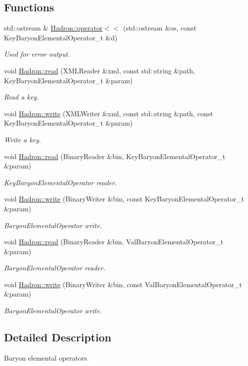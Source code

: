 \subsection*{Functions}
\begin{DoxyCompactItemize}
\item 
std\+::ostream \& \mbox{\hyperlink{namespaceHadron_aa9e7054b51bfae4b2afe5aeb8f904b2b}{Hadron\+::operator$<$$<$}} (std\+::ostream \&os, const Key\+Baryon\+Elemental\+Operator\+\_\+t \&d)
\begin{DoxyCompactList}\small\item\em Used for error output. \end{DoxyCompactList}\item 
void \mbox{\hyperlink{namespaceHadron_a61520b9a5ce2b207d1c01e1508a5c470}{Hadron\+::read}} (X\+M\+L\+Reader \&xml, const std\+::string \&path, Key\+Baryon\+Elemental\+Operator\+\_\+t \&param)
\begin{DoxyCompactList}\small\item\em Read a key. \end{DoxyCompactList}\item 
void \mbox{\hyperlink{namespaceHadron_ac358b1203bd94f6b26452402911ce174}{Hadron\+::write}} (X\+M\+L\+Writer \&xml, const std\+::string \&path, const Key\+Baryon\+Elemental\+Operator\+\_\+t \&param)
\begin{DoxyCompactList}\small\item\em Write a key. \end{DoxyCompactList}\item 
void \mbox{\hyperlink{namespaceHadron_afb941d679afa3b1d65ca3048b28bc78c}{Hadron\+::read}} (Binary\+Reader \&bin, Key\+Baryon\+Elemental\+Operator\+\_\+t \&param)
\begin{DoxyCompactList}\small\item\em Key\+Baryon\+Elemental\+Operator reader. \end{DoxyCompactList}\item 
void \mbox{\hyperlink{namespaceHadron_a4c0a824fa457c4fbaac034c83f5554c5}{Hadron\+::write}} (Binary\+Writer \&bin, const Key\+Baryon\+Elemental\+Operator\+\_\+t \&param)
\begin{DoxyCompactList}\small\item\em Baryon\+Elemental\+Operator write. \end{DoxyCompactList}\item 
void \mbox{\hyperlink{namespaceHadron_ae87d364dcd64ddf5c60a1b4d6237e633}{Hadron\+::read}} (Binary\+Reader \&bin, Val\+Baryon\+Elemental\+Operator\+\_\+t \&param)
\begin{DoxyCompactList}\small\item\em Baryon\+Elemental\+Operator reader. \end{DoxyCompactList}\item 
void \mbox{\hyperlink{namespaceHadron_a6ba238c6945bb5d95ae189cfee93a690}{Hadron\+::write}} (Binary\+Writer \&bin, const Val\+Baryon\+Elemental\+Operator\+\_\+t \&param)
\begin{DoxyCompactList}\small\item\em Baryon\+Elemental\+Operator write. \end{DoxyCompactList}\end{DoxyCompactItemize}


\subsection{Detailed Description}
Baryon elemental operators. 

